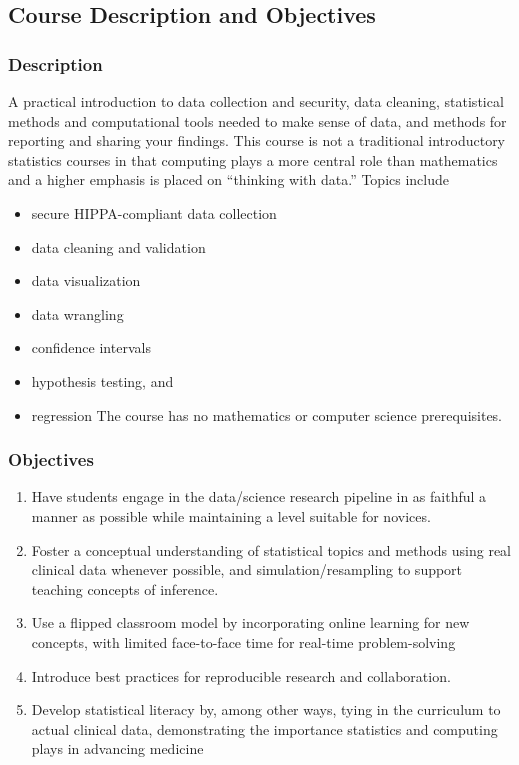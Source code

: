 \documentclass[]{book}
\providecommand{\tightlist}{%
  \setlength{\itemsep}{0pt}\setlength{\parskip}{0pt}}
\theoremstyle{definition}
\theoremstyle{definition}
\theoremstyle{definition}
\theoremstyle{remark}
\begin{document}
\hypertarget{course-description-and-objectives}{%
\subsection{Course Description and
Objectives}\label{course-description-and-objectives}}

\hypertarget{description}{%
\subsubsection{Description}\label{description}}

A practical introduction to data collection and security, data cleaning,
statistical methods and computational tools needed to make sense of
data, and methods for reporting and sharing your findings. This course
is not a traditional introductory statistics courses in that computing
plays a more central role than mathematics and a higher emphasis is
placed on ``thinking with data.'' Topics include

\begin{itemize}
\tightlist
\item
  secure HIPPA-compliant data collection
\item
  data cleaning and validation
\item
  data visualization
\item
  data wrangling
\item
  confidence intervals
\item
  hypothesis testing, and
\item
  regression The course has no mathematics or computer science
  prerequisites. 
\end{itemize}

\hypertarget{objectives}{%
\subsubsection{Objectives}\label{objectives}}

\begin{enumerate}
\def\labelenumi{\arabic{enumi}.}
\tightlist
\item
  Have students engage in the data/science research pipeline in as
  faithful a manner as possible while maintaining a level suitable for
  novices.
\item
  Foster a conceptual understanding of statistical topics and methods
  using real clinical data whenever possible, and simulation/resampling
  to support teaching concepts of inference.
\item
  Use a flipped classroom model by incorporating online learning for new
  concepts, with limited face-to-face time for real-time problem-solving
\item
  Introduce best practices for reproducible research and collaboration.
\item
  Develop statistical literacy by, among other ways, tying in the
  curriculum to actual clinical data, demonstrating the importance
  statistics and computing plays in advancing medicine 
\end{enumerate}
\end{document}
